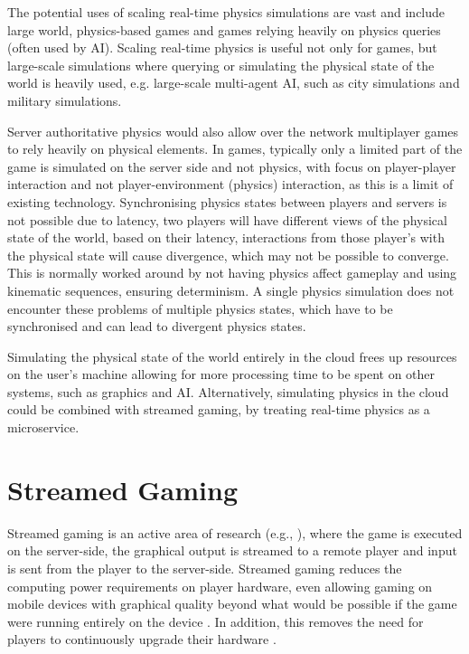 The potential uses of scaling real-time physics simulations are vast and include large world, physics-based games and games relying heavily on physics queries (often used by AI). Scaling real-time physics is useful not only for games, but large-scale simulations where querying or simulating the physical state of the world is heavily used, e.g. large-scale multi-agent AI, such as city simulations and military simulations. 

Server authoritative physics would also allow over the network multiplayer games to rely heavily on physical elements. In games, typically only a limited part of the game is simulated on the server side and not physics, with focus on player-player interaction and not player-environment (physics) interaction, as this is a limit of existing technology. 
Synchronising physics states between players and servers is not possible due to latency, two players will have different views of the physical state of the world, based on their latency, interactions from those player's with the physical state will cause divergence, which may not be possible to converge. This is normally worked around by not having physics affect gameplay and using kinematic sequences, ensuring determinism. A single physics simulation does not encounter these problems of multiple physics states, which have to be synchronised and can lead to divergent physics states. 

Simulating the physical state of the world entirely in the cloud frees up resources on the user's machine allowing for more processing time to be spent on other systems, such as graphics and AI. Alternatively, simulating physics in the cloud could be combined with streamed gaming, by treating real-time physics as a microservice.

\section{Streamed Gaming}
Streamed gaming is an active area of research (e.g., \cite{GARCIAVALLS}), where the game is executed on the server-side, the graphical output is streamed to a remote player and input is sent from the player to the server-side.
Streamed gaming reduces the computing power requirements on player hardware, even allowing gaming on mobile devices with graphical quality beyond what would be possible if the game were running entirely on the device \cite{CloudGamingArchPerf}. In addition, this removes the need for players to continuously upgrade their hardware \cite{LatencyoOfCloudGamingSystems}. 

